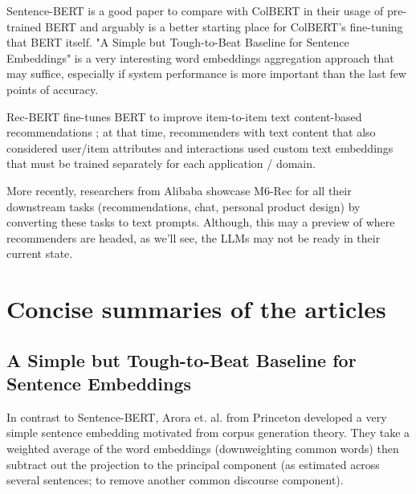 \documentclass[11pt]{article}
\begin{document}
Sentence-BERT \cite{Reimers2019} is a good paper to compare with ColBERT in their usage of pre-trained BERT and arguably is a better starting place for ColBERT's fine-tuning that BERT itself. "A Simple but Tough-to-Beat Baseline for Sentence Embeddings" \cite{Arora2017} is a very interesting word embeddings aggregation approach that may suffice, especially if system performance is more important than the last few points of accuracy. 

Rec-BERT fine-tunes BERT to improve item-to-item text content-based recommendations \cite{Malkiel2020}; at that time, recommenders with text content that also considered user/item attributes and interactions used custom text embeddings that must be trained separately for each application / domain.

More recently, researchers from Alibaba showcase M6-Rec \cite{Cui2022} for all their downstream tasks (recommendations, chat, personal product design) by converting these tasks to text prompts. Although, this may a preview of where recommenders are headed, as we'll see, the LLMs may not be ready in their current state. 

\section{Concise summaries of the articles} 

\subsection{A Simple but Tough-to-Beat Baseline for Sentence Embeddings \cite{Arora2017}}

In contrast to Sentence-BERT, Arora et. al. from Princeton developed a very simple sentence embedding motivated from corpus generation theory. They take a weighted average of the word embeddings (downweighting common words) then subtract out the projection to the principal component (as estimated across several sentences; to remove another common discourse component).
\end{document}
